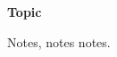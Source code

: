 \documentclass[8pt]{minimal}
\begin{document}
\begin{flushleft}
\begin{multicols}{3}

    \textbf{Topic}

    Notes, notes notes.

    \lipsum
    \lipsum

\end{multicols}
\end{flushleft}
\end{document}
